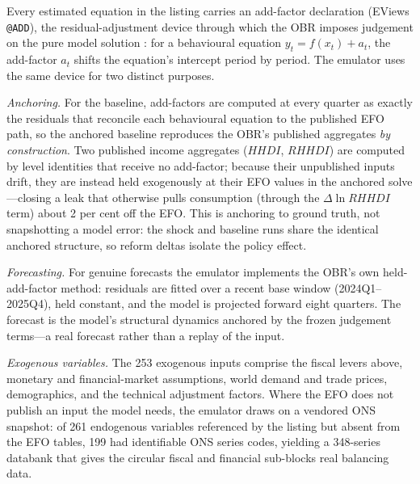 Every estimated equation in the listing carries an add-factor declaration (EViews \texttt{@ADD}), the residual-adjustment device through which the OBR imposes judgement on the pure model solution \citep{obr2013model}: for a behavioural equation $y_t = f(x_t) + a_t$, the add-factor $a_t$ shifts the equation's intercept period by period. The emulator uses the same device for two distinct purposes.

\emph{Anchoring.} For the baseline, add-factors are computed at every quarter as exactly the residuals that reconcile each behavioural equation to the published EFO path, so the anchored baseline reproduces the OBR's published aggregates \emph{by construction}. Two published income aggregates ($HHDI$, $RHHDI$) are computed by level identities that receive no add-factor; because their unpublished inputs drift, they are instead held exogenously at their EFO values in the anchored solve---closing a leak that otherwise pulls consumption (through the $\Delta\ln RHHDI$ term) about 2 per cent off the EFO. This is anchoring to ground truth, not snapshotting a model error: the shock and baseline runs share the identical anchored structure, so reform deltas isolate the policy effect.

\emph{Forecasting.} For genuine forecasts the emulator implements the OBR's own held-add-factor method: residuals are fitted over a recent base window (2024Q1--2025Q4), held constant, and the model is projected forward eight quarters. The forecast is the model's structural dynamics anchored by the frozen judgement terms---a real forecast rather than a replay of the input.

\emph{Exogenous variables.} The 253 exogenous inputs comprise the fiscal levers above, monetary and financial-market assumptions, world demand and trade prices, demographics, and the technical adjustment factors. Where the EFO does not publish an input the model needs, the emulator draws on a vendored ONS snapshot: of 261 endogenous variables referenced by the listing but absent from the EFO tables, 199 had identifiable ONS series codes, yielding a 348-series databank that gives the circular fiscal and financial sub-blocks real balancing data.
